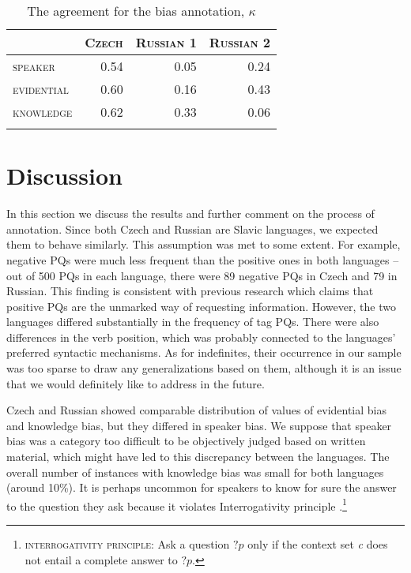 \documentclass[output=paper,colorlinks,citecolor=brown]{langscibook}
\begin{document}
\begin{table}
\caption{The agreement for the bias annotation, $\kappa$}
\label{tab-agreem}
 \begin{tabularx}{.7\textwidth}{Xrrr} %
  \lsptoprule
            & \textsc{Czech} & \textsc{Russian 1} & \textsc{Russian 2}\\
  \midrule
  \textsc{speaker}         & 0.54   & 0.05   & 0.24 \\
  \textsc{evidential}      & 0.60   & 0.16   & 0.43 \\
  \textsc{knowledge}       & 0.62   & 0.33   & 0.06 \\
  \lspbottomrule
 \end{tabularx}
\end{table}


\section{Discussion} \label{sec-discussion}
In this section we discuss the results and further comment on the process of annotation. Since both Czech and Russian are Slavic languages, we expected them to behave similarly. This assumption was met to some extent. For example, negative PQs were much less frequent than the positive ones in both languages -- out of 500 PQs in each language, there were 89 negative PQs in Czech and 79 in Russian. This finding is consistent with previous research which claims that positive PQs are the unmarked way of requesting information. However, the two languages differed substantially in the frequency of tag PQs. There were also differences in the verb position, which was probably connected to the languages' preferred syntactic mechanisms. As for indefinites, their occurrence in our sample was too sparse to draw any generalizations based on them, although it is an issue that we would definitely like to address in the future. 

Czech and Russian showed comparable distribution of values of evidential bias and knowledge bias, but they differed in speaker bias. We suppose that speaker bias was a category too difficult to be objectively judged based on written material, which might have led to this discrepancy between the languages. The overall number of instances with knowledge bias was small for both languages (around 10\%). It is perhaps uncommon for speakers to know for sure the answer to the question they ask because it violates Interrogativity principle \citep{Goodhue2018a}.\footnote{\textsc{interrogativity principle:} Ask a question $?p$ only if the context set \textit{c} does not entail a complete answer to $?p$.}
\end{document}
